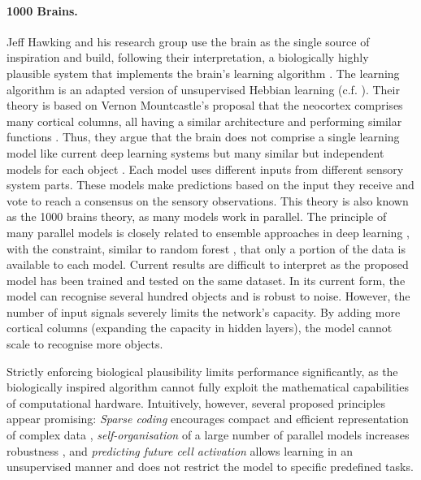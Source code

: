\paragraph{1000 Brains.} Jeff Hawking and his research group use the brain as the single source of inspiration and build, following their interpretation, a biologically highly plausible system that implements the brain's learning algorithm . The learning algorithm is an adapted version of unsupervised Hebbian learning (c.f. ). Their theory is based on Vernon Mountcastle's proposal that the neocortex comprises many cortical columns, all having a similar architecture and performing similar functions . Thus, they argue that the brain does not comprise a single learning model like current deep learning systems but many similar but independent models for each object . Each model uses different inputs from different sensory system parts. These models make predictions based on the input they receive and vote to reach a consensus on the sensory observations.
This theory is also known as the 1000 brains theory, as many models work in parallel. The principle of many parallel models is closely related to ensemble approaches in deep learning , with the constraint, similar to random forest , that only a portion of the data is available to each model. Current results are difficult to interpret as the proposed model has been trained and tested on the same dataset. In its current form, the model can recognise several hundred objects and is robust to noise. However, the number of input signals severely limits the network's capacity. By adding more cortical columns (expanding the capacity in hidden layers), the model cannot scale to recognise more objects. 

Strictly enforcing biological plausibility limits performance significantly, as the biologically inspired algorithm cannot fully exploit the mathematical capabilities of computational hardware. Intuitively, however, several proposed principles appear promising: \emph{Sparse coding} encourages compact and efficient representation of complex data , \emph{self-organisation} of a large number of parallel models increases robustness \cite{Yang_Lv_Chen_2023}, and \emph{predicting future cell activation} allows learning in an unsupervised manner and does not restrict the model to specific predefined tasks.

